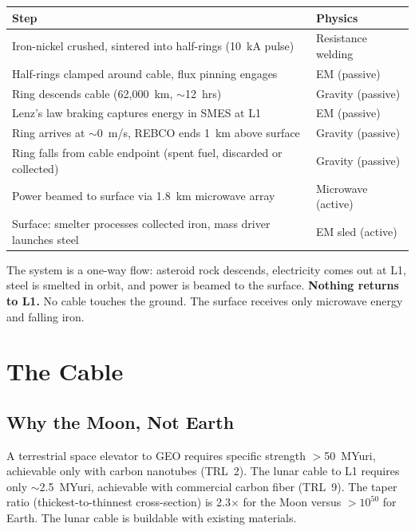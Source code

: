 \documentclass[12pt,letterpaper]{article}
\begin{document}
\begin{center}
\begin{tabular}{ll}
\toprule
\textbf{Step} & \textbf{Physics} \\
\midrule
Iron-nickel crushed, sintered into half-rings (10~kA pulse) & Resistance welding \\
Half-rings clamped around cable, flux pinning engages & EM (passive) \\
Ring descends cable (62,000~km, $\sim$12~hrs) & Gravity (passive) \\
Lenz's law braking captures energy in SMES at L1 & EM (passive) \\
Ring arrives at ${\sim}$0~m/s, REBCO ends 1~km above surface & Gravity (passive) \\
Ring falls from cable endpoint (spent fuel, discarded or collected) & Gravity (passive) \\
Power beamed to surface via 1.8~km microwave array & Microwave (active) \\
Surface: smelter processes collected iron, mass driver launches steel & EM sled (active) \\
\bottomrule
\end{tabular}
\end{center}

The system is a one-way flow: asteroid rock descends, electricity comes out at L1, steel is smelted in orbit, and power is beamed to the surface. \textbf{Nothing returns to L1.} No cable touches the ground. The surface receives only microwave energy and falling iron.

\section{The Cable}

\subsection{Why the Moon, Not Earth}

A terrestrial space elevator to GEO requires specific strength $>$50~MYuri, achievable only with carbon nanotubes (TRL~2). The lunar cable to L1 requires only $\sim$2.5~MYuri, achievable with commercial carbon fiber (TRL~9). The taper ratio (thickest-to-thinnest cross-section) is 2.3$\times$ for the Moon versus $>10^{50}$ for Earth. The lunar cable is buildable with existing materials.
\end{document}
